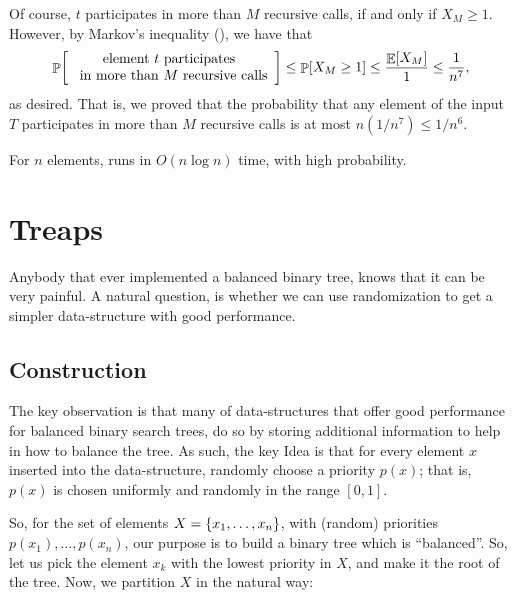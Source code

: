 Of course, $t$ participates in more than $M$ recursive calls, if and
only if $X_M \geq 1$. However, by Markov's inequality
(), we have that
\begin{align*}
    \Prob{ \begin{array}{c}
           \text{element } t \text{ participates }\\
           \text{ in more than } M \text{ recursive calls}
       \end{array}
    }%
    \leq %
    \Prob{ \MakeBig X_M \geq 1 }%
    \leq%
    \frac{\Ex{X_M}}{1} \leq \frac{1}{n^7},
\end{align*}
as desired. That is, we proved that the probability that any element
of the input $T$ participates in more than $M$ recursive calls is at
most $n(1/n^7) \leq 1/n^6$.

\begin{theorem}
    For $n$ elements, \QuickSort runs in $O(n \log n)$ time, with high
    probability.
\end{theorem}


\section{Treaps}

Anybody that ever implemented a balanced binary tree, knows that it
can be very painful. A natural question, is whether we can use
randomization to get a simpler data-structure with good performance.

\subsection{Construction}

The key observation is that many of data-structures that offer good
performance for balanced binary search trees, do so by storing
additional information to help in how to balance the tree.  As such,
the key Idea is that for every element $x$ inserted into the
data-structure, randomly choose a priority $p(x)$; that is, $p(x)$ is
chosen uniformly and randomly in the range $[0,1]$.

So, for the set of elements $X=\left\{ {x_{1},\ldots,x_{n}} \right\}$, with
(random) priorities $p(x_{1}),\ldots,p(x_{n})$, our purpose is to
build a binary tree which is ``balanced''.  So, let us pick the
element $x_{k}$ with the lowest priority in $X$, and make it the root
of the tree. Now, we partition $X$ in the natural way:


